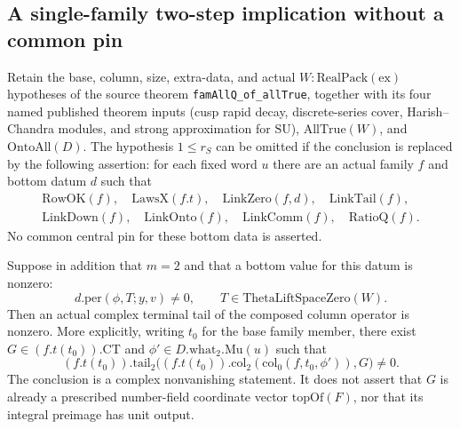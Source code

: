 \subsection{A single-family two-step implication without a common pin}
\label{sec:single-family-m2}

\begin{proposition}
\label{prop:single-family-m2}
Retain the base, column, size, extra-data, and actual
$W:\mathrm{RealPack}(\mathrm{ex})$ hypotheses of the source theorem
\texttt{famAllQ\_of\_allTrue}, together with its four named published
theorem inputs (cusp rapid decay, discrete-series cover,
Harish--Chandra modules, and strong approximation for $\mathrm{SU}$),
$\mathrm{AllTrue}(W)$, and $\mathrm{OntoAll}(D)$.
The hypothesis $1\leq r_S$ can be omitted if the conclusion is replaced
by the following assertion: for each fixed word $u$ there are an actual
family $f$ and bottom datum $d$ such that
\[
 \begin{gathered}
 \mathrm{RowOK}(f),\quad \mathrm{LawsX}(f.t),\quad
 \mathrm{LinkZero}(f,d),\quad \mathrm{LinkTail}(f),\\
 \mathrm{LinkDown}(f),\quad \mathrm{LinkOnto}(f),\quad
 \mathrm{LinkComm}(f),\quad \mathrm{RatioQ}(f).
 \end{gathered}
\]
No common central pin for these bottom data is asserted.

Suppose in addition that $m=2$ and that a bottom value for this datum
is nonzero:
\[
 d.\mathrm{per}(\phi,T;y,v)\ne0,
 \qquad T\in\mathrm{ThetaLiftSpaceZero}(W).
\]
Then an actual complex terminal tail of the composed column operator
is nonzero.  More explicitly, writing $t_0$ for the base family member,
there exist $G\in(f.t(t_0)).\mathrm{CT}$ and
$\phi'\in D.\mathrm{what}_2.\mathrm{Mu}(u)$ such that
\[
 (f.t(t_0)).\mathrm{tail}_2
 \bigl((f.t(t_0)).\mathrm{col}_2(\mathrm{col}_0(f,t_0,\phi')),
       G\bigr)\ne0.
\]
The conclusion is a complex nonvanishing statement.  It does not
assert that $G$ is already a prescribed number-field coordinate vector
$\mathrm{topOf}(F)$, nor that its integral preimage has unit output.
\end{proposition}

